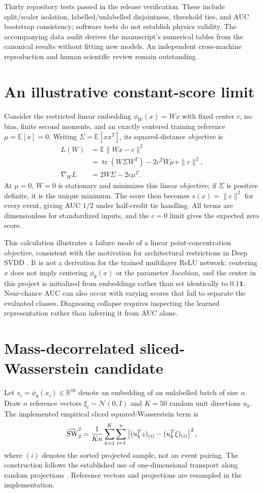 \documentclass[reprint,aps,pra,amsmath,amssymb,floatfix,raggedbottom]{revtex4-2}
\begin{document}
Thirty repository tests passed in the release verification. These include split/scaler isolation, labelled/unlabelled disjointness, threshold ties, and AUC bootstrap consistency; software tests do not establish physics validity. The accompanying data audit derives the manuscript's numerical tables from the canonical results without fitting new models. An independent cross-machine reproduction and human scientific review remain outstanding.

\section{An illustrative constant-score limit}\label{app:diagnostics}
Consider the restricted linear embedding $\phi_W(x)=Wx$ with fixed center $c$, no bias, finite second moments, and an exactly centered training reference $\mu=\mathbb E[x]=0$. Writing $\Sigma=\mathbb E[xx^T]$, its squared-distance objective is
\begin{align}
 L(W)&=\mathbb E\|Wx-c\|^2\\
 &=\operatorname{tr}(W\Sigma W^T)-2c^TW\mu+\|c\|^2,\\
 \nabla_W L&=2W\Sigma-2c\mu^T.
\end{align}
At $\mu=0$, $W=0$ is stationary and minimizes this linear objective; if $\Sigma$ is positive definite, it is the unique minimum. The score then becomes $s(x)=\|c\|^2$ for every event, giving AUC $1/2$ under half-credit tie handling. All terms are dimensionless for standardized inputs, and the $c=0$ limit gives the expected zero score.

This calculation illustrates a failure mode of a linear point-concentration objective, consistent with the motivation for architectural restrictions in Deep SVDD \cite{svdd}. It is not a derivation for the trained multilayer ReLU network: centering $x$ does not imply centering $\phi_\theta(x)$ or the parameter Jacobian, and the center in this project is initialized from embeddings rather than set identically to $0.1\mathbf1$. Near-chance AUC can also occur with varying scores that fail to separate the evaluated classes. Diagnosing collapse requires inspecting the learned representation rather than inferring it from AUC alone.

\section{Mass-decorrelated sliced-Wasserstein candidate}\label{app:mdswad}
Let $z_i=\phi_\theta(x_i)\in\mathbb R^{16}$ denote an embedding of an unlabelled batch of size $n$. Draw $n$ reference vectors $\xi_i\sim\mathcal N(0,I)$ and $K=50$ random unit directions $u_k$. The implemented empirical sliced squared-Wasserstein term is
\begin{equation}
 \widehat{\mathrm{SW}}_2^2={1\over Kn}\sum_{k=1}^K\sum_{i=1}^n
 \left[(u_k^Tz)_{(i)}-(u_k^T\xi)_{(i)}\right]^2,
\end{equation}
where $(i)$ denotes the sorted projected sample, not an event pairing. The construction follows the established use of one-dimensional transport along random projections \cite{sliced}. Reference vectors and projections are resampled in the implementation.
\end{document}
